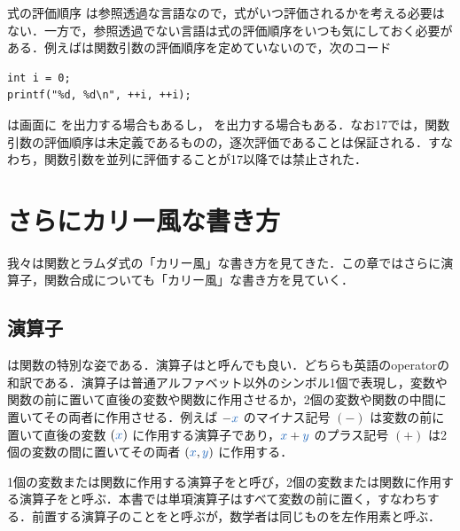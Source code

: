 \documentclass[a5paper,twoside,fleqn,draft]{jsbook}
\begin{document}

\begin{note}{式の評価順序}
\haskell は参照透過な言語なので，式がいつ評価されるかを考える必要はない．一方で，参照透過でない言語は式の評価順序をいつも気にしておく必要がある．例えば\clang は関数引数の評価順序を定めていないので，次のコード
\begin{ccode}
\begin{verbatim}
int i = 0;
printf("%d, %d\n", ++i, ++i);
\end{verbatim}
\end{ccode}
は画面に  を出力する場合もあるし， を出力する場合もある．なお\cxx17では，関数引数の評価順序は未定義であるものの，逐次評価であることは保証される．すなわち，関数引数を並列に評価することが\cxx17以降では禁止された．
\end{note}

\chapter{さらにカリー風な書き方}
\label{ch:more-curry}

\begin{leader}
我々は関数とラムダ式の「カリー風」な書き方を見てきた．この章ではさらに演算子，関数合成についても「カリー風」な書き方を見ていく．
\end{leader}

\section{演算子}

は関数の特別な姿である．演算子はと呼んでも良い．どちらも英語のoperatorの和訳である．演算子は普通アルファベット以外のシンボル1個で表現し，変数や関数の前に置いて直後の変数や関数に作用させるか，2個の変数や関数の中間に置いてその両者に作用させる．例えば $-\hVar{x}$ のマイナス記号 $(-)$ は変数の前に置いて直後の変数 $(\hVar{x})$ に作用する演算子であり，$\hVar{x}+\hVar{y}$ のプラス記号 $(+)$ は2個の変数の間に置いてその両者 $(\hVar{x},\hVar{y})$ に作用する．

1個の変数または関数に作用する演算子をと呼び，2個の変数または関数に作用する演算子をと呼ぶ．本書では単項演算子はすべて変数の前に置く，すなわちする．前置する演算子のことをと呼ぶが，数学者は同じものを左作用素と呼ぶ．
\end{document}

